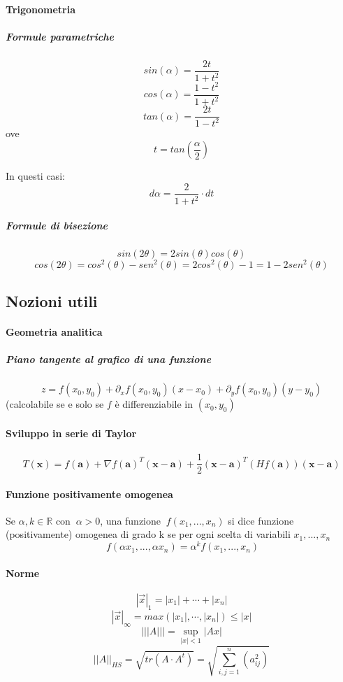 \documentclass[a4paper,12pt]{article}
\begin{document}
\paragraph{Trigonometria}
\subparagraph{Formule parametriche}
$$sin(\alpha) = \frac{2t}{1+t^2}$$
$$cos(\alpha) = \frac{1-t^2}{1+t^2}$$
$$tan(\alpha) = \frac{2t}{1-t^2}$$
ove $$t = tan\left(\frac{\alpha}{2}\right)$$

In questi casi:
$$ d\alpha = \frac{2}{1+t^2}\cdot dt$$

\subparagraph{Formule di bisezione}
$$sin(2\theta) = 2sin(\theta)cos(\theta)$$
$$cos(2\theta)=cos^2(\theta)-sen^2(\theta)= 2cos^2(\theta)-1=1-2sen^2(\theta)$$

\subsection{Nozioni utili}
\paragraph{Geometria analitica}
\subparagraph{Piano tangente al grafico di una funzione}
$$z = f(x_0, y_0) + \partial_x f(x_0, y_0) (x-x_0) + \partial_y f(x_0, y_0) (y - y_0) $$
(calcolabile se e solo se $f$ è differenziabile in $(x_0, y_0)$

\paragraph{Sviluppo in serie di Taylor}

$$T(\mathbf{x}) = f(\mathbf{a}) + \nabla f(\mathbf{a})^T (\mathbf{x} - \mathbf{a}) + \frac{1}{2} (\mathbf{x} - \mathbf{a})^T (H f(\mathbf{a})) (\mathbf{x} - \mathbf{a})$$

\paragraph{Funzione positivamente omogenea}
Se $\alpha, k \in \mathbb{R}$ con $\ \alpha > 0 $, una funzione $\ f(x_{1}, . . ., x_{n})$ si dice funzione (positivamente) omogenea di grado k se per ogni scelta di variabili $x_1,...,x_n$
$$\ f(\alpha x_{1}, . . ., \alpha x_{n})= {\alpha}^{k}f(x_{1}, . . ., x_{n})$$

\paragraph{Norme}
$$|\vec{x}|_1 = |x_1|+\cdots+|x_n|$$
$$|\vec{x}|_\infty = max( |x_1|,\cdots,|x_n|) \leq |x|$$
$$|||A||| = \sup_{|x|<1}|Ax|$$
$$||A||_{HS} = \sqrt{tr(A\cdot A^t)} = \sqrt{\sum_{i,j=1}^n (a_{ij}^2)}$$
\end{document}
